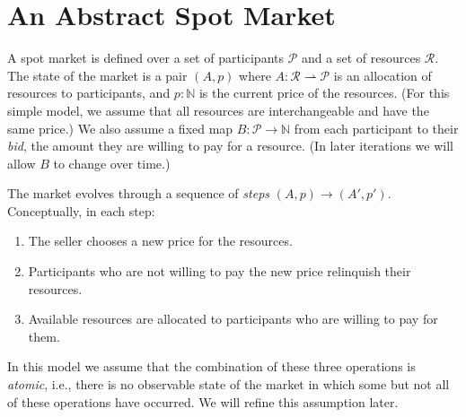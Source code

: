 \documentclass[acmsmall,review,screen]{acmart}
\begin{document}

\keywords{}

\maketitle

\section{An Abstract Spot Market}
A spot market is defined over a set of participants $\mathcal{P}$ and a set of resources $\mathcal{R}$. The state of the market is a pair $(A, p)$ where $A : \mathcal{R} \rightharpoonup \mathcal{P}$ is an allocation of resources to participants, and $p : \mathbb{N}$ is the current price of the resources. (For this simple model, we assume that all resources are interchangeable and have the same price.) We also assume a fixed map $B : \mathcal{P} \rightarrow \mathbb{N}$ from each participant to their \emph{bid}, the amount they are willing to pay for a resource. (In later iterations we will allow $B$ to change over time.)

The market evolves through a sequence of \emph{steps} $(A, p) \rightarrow (A', p')$. Conceptually, in each step:
\begin{enumerate}
\item The seller chooses a new price for the resources.
\item Participants who are not willing to pay the new price relinquish their resources.
\item Available resources are allocated to participants who are willing to pay for them.
\end{enumerate}
In this model we assume that the combination of these three operations is \emph{atomic}, i.e., there is no observable state of the market in which some but not all of these operations have occurred. We will refine this assumption later.
\end{document}
